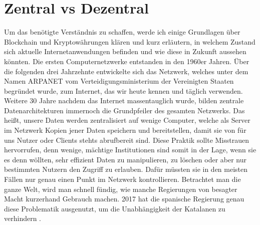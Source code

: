 \section{Zentral vs Dezentral}
Um das benötigte Verständnis zu schaffen, werde ich einige Grundlagen über Blockchain und Kryptowährungen klären und kurz erläutern, in welchem Zustand sich aktuelle Internetanwendungen befinden und wie diese in Zukunft aussehen könnten. \clearpage
Die ersten Computernetzwerke entstanden in den 1960er Jahren. Über die folgenden drei Jahrzehnte entwickelte sich das Netzwerk, welches unter dem Namen ARPANET vom Verteidigungsministerium der Vereinigten Staaten begründet wurde, zum Internet, das wir heute kennen und täglich verwenden\cite{arpanet}. Weitere 30 Jahre nachdem das Internet massentauglich wurde, bilden zentrale Datenarchitekturen immernoch die Grundpfeiler des gesamten Netzwerks. Das heißt, unsere Daten werden zentralisiert auf wenige Computer, welche als Server im Netzwerk Kopien jener Daten speichern und bereitstellen, damit sie von für uns Nutzer oder Clients stehts abrufbereit sind. Diese Praktik sollte Misstrauen hervorrufen, denn wenige, mächtige Institutionen sind somit in der Lage, wenn sie es denn wöllten, sehr effizient Daten zu manipulieren, zu löschen oder aber nur bestimmten Nutzern den Zugriff zu erlauben. Dafür müssten sie in den meisten Fällen nur genau einen Punkt im Netzwerk kontrollieren. Betrachtet man die ganze Welt, wird man schnell fündig, wie manche Regierungen von besagter Macht kurzerhand Gebrauch machen. 2017 hat die spanische Regierung genau diese Problematik ausgenutzt, um die Unabhängigkeit der Katalanen zu verhindern \cite{catalonia}.
